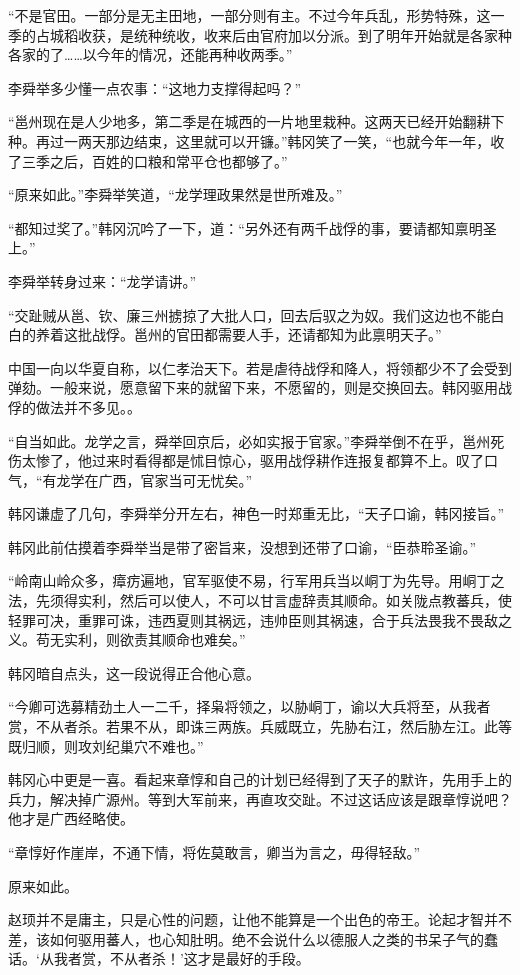 “不是官田。一部分是无主田地，一部分则有主。不过今年兵乱，形势特殊，这一季的占城稻收获，是统种统收，收来后由官府加以分派。到了明年开始就是各家种各家的了……以今年的情况，还能再种收两季。”

李舜举多少懂一点农事：“这地力支撑得起吗？”

“邕州现在是人少地多，第二季是在城西的一片地里栽种。这两天已经开始翻耕下种。再过一两天那边结束，这里就可以开镰。”韩冈笑了一笑，“也就今年一年，收了三季之后，百姓的口粮和常平仓也都够了。”

“原来如此。”李舜举笑道，“龙学理政果然是世所难及。”

“都知过奖了。”韩冈沉吟了一下，道：“另外还有两千战俘的事，要请都知禀明圣上。”

李舜举转身过来：“龙学请讲。”

“交趾贼从邕、钦、廉三州掳掠了大批人口，回去后驭之为奴。我们这边也不能白白的养着这批战俘。邕州的官田都需要人手，还请都知为此禀明天子。”

中国一向以华夏自称，以仁孝治天下。若是虐待战俘和降人，将领都少不了会受到弹劾。一般来说，愿意留下来的就留下来，不愿留的，则是交换回去。韩冈驱用战俘的做法并不多见。。

“自当如此。龙学之言，舜举回京后，必如实报于官家。”李舜举倒不在乎，邕州死伤太惨了，他过来时看得都是怵目惊心，驱用战俘耕作连报复都算不上。叹了口气，“有龙学在广西，官家当可无忧矣。”

韩冈谦虚了几句，李舜举分开左右，神色一时郑重无比，“天子口谕，韩冈接旨。”

韩冈此前估摸着李舜举当是带了密旨来，没想到还带了口谕，“臣恭聆圣谕。”

“岭南山岭众多，瘴疠遍地，官军驱使不易，行军用兵当以峒丁为先导。用峒丁之法，先须得实利，然后可以使人，不可以甘言虚辞责其顺命。如关陇点教蕃兵，使轻罪可决，重罪可诛，违西夏则其祸远，违帅臣则其祸速，合于兵法畏我不畏敌之义。苟无实利，则欲责其顺命也难矣。”

韩冈暗自点头，这一段说得正合他心意。

“今卿可选募精劲土人一二千，择枭将领之，以胁峒丁，谕以大兵将至，从我者赏，不从者杀。若果不从，即诛三两族。兵威既立，先胁右江，然后胁左江。此等既归顺，则攻刘纪巢穴不难也。”

韩冈心中更是一喜。看起来章惇和自己的计划已经得到了天子的默许，先用手上的兵力，解决掉广源州。等到大军前来，再直攻交趾。不过这话应该是跟章惇说吧？他才是广西经略使。

“章惇好作崖岸，不通下情，将佐莫敢言，卿当为言之，毋得轻敌。”

原来如此。

赵顼并不是庸主，只是心性的问题，让他不能算是一个出色的帝王。论起才智并不差，该如何驱用蕃人，也心知肚明。绝不会说什么以德服人之类的书呆子气的蠢话。‘从我者赏，不从者杀！’这才是最好的手段。

